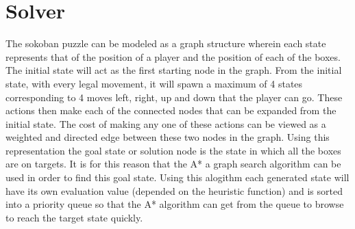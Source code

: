 \documentclass[a4paper,12pt]{article}
\begin{document}
\section{Solver}
The sokoban puzzle can be modeled as a graph structure wherein each state represents that of the position of a player and the position of each of the boxes. The initial state will act as the first starting node in the graph. From the initial state, with every legal movement, it will spawn a maximum of 4 states corresponding to 4 moves left, right, up and down that the player can go. These actions then make each of the connected nodes that can be expanded from the initial state. The cost of making any one of these actions can be viewed as a weighted and directed edge between these two nodes in the graph. Using this representation the goal state or solution node is the state in which all the boxes are on targets. It is for this reason that the A* a graph search algorithm can be used in order to find this goal state. Using this alogithm each generated state will have its own evaluation value (depended on the heuristic function) and is sorted into a priority queue so that the A* algorithm can get from the queue to browse to reach the target state quickly.
\end{document}
